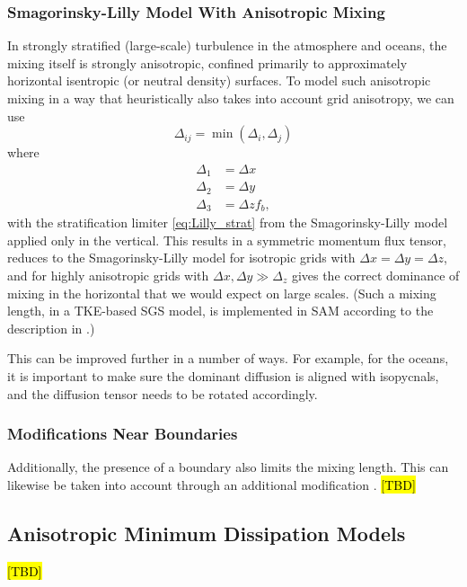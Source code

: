 \documentclass{article}
\begin{document}
\subsubsection{Smagorinsky-Lilly Model With Anisotropic Mixing}

In strongly stratified (large-scale) turbulence in the atmosphere and oceans, the mixing itself is strongly anisotropic, confined primarily to approximately horizontal isentropic (or neutral density) surfaces. To model such anisotropic mixing in a way that heuristically also takes into account grid anisotropy, we can use 
\begin{equation}
\Delta_{ij} = \min(\Delta_i, \Delta_j)  
\end{equation}
where 
\begin{align}
\Delta_1 & = \Delta x \\
\Delta_2 & = \Delta y \\
\Delta_3 & = \Delta z f_b,
\end{align}
with the stratification limiter \eqref{eq:Lilly_strat} from the Smagorinsky-Lilly model applied only in the vertical. This results in a symmetric momentum flux tensor, reduces to the Smagorinsky-Lilly model for isotropic grids with $\Delta x = \Delta y = \Delta z$, and for highly anisotropic grids with $\Delta x, \Delta y \gg \Delta_z$ gives the correct dominance of mixing in the horizontal that we would expect on large scales. (Such a mixing length, in a TKE-based SGS model, is implemented in SAM according to the description in \citet{Stevens05a}.) 

This can be improved further in a number of ways. For example, for the oceans, it is important to make sure the dominant diffusion is aligned with isopycnals, and the diffusion tensor needs to be rotated accordingly. 

\subsubsection{Modifications Near Boundaries}
 
Additionally, the presence of a boundary also limits the mixing length. This can likewise be taken into account through an additional modification \citep{Kleissl03a}.  \hl{[TBD]}

\subsection{Anisotropic Minimum Dissipation Models}

\hl{[TBD]}
\citep{Abkar17a}
\end{document}
